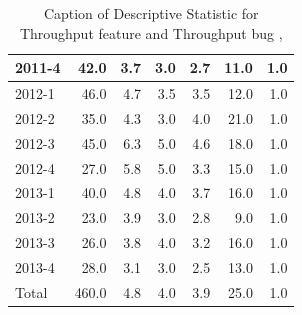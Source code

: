 \documentclass[UKenglish]{ifimaster}  %
\begin{document}
\begin{appendices}
\begin{table}[!htbp]
\begin{adjustwidth}{-2.5cm}{}
{{\begin{tabular}{ | l | r | r | r | r | r | r | }
2011-4 & 42.0 & 3.7 & 3.0 & 2.7 & 11.0 & 1.0\\ \hline
2012-1 & 46.0 & 4.7 & 3.5 & 3.5 & 12.0 & 1.0\\ \hline
2012-2 & 35.0 & 4.3 & 3.0 & 4.0 & 21.0 & 1.0\\ \hline
2012-3 & 45.0 & 6.3 & 5.0 & 4.6 & 18.0 & 1.0\\ \hline
2012-4 & 27.0 & 5.8 & 5.0 & 3.3 & 15.0 & 1.0\\ \hline
2013-1 & 40.0 & 4.8 & 4.0 & 3.7 & 16.0 & 1.0\\ \hline
2013-2 & 23.0 & 3.9 & 3.0 & 2.8 & 9.0 & 1.0\\ \hline
2013-3 & 26.0 & 3.8 & 4.0 & 3.2 & 16.0 & 1.0\\ \hline
2013-4 & 28.0 & 3.1 & 3.0 & 2.5 & 13.0 & 1.0\\ \hline
Total & 460.0 & 4.8 & 4.0 & 3.9 & 25.0 & 1.0\\ \hline
\end{tabular}
}
}
\end{adjustwidth}
\caption[Optional caption for list of figures]{Caption of Descriptive Statistic for Throughput feature and Throughput bug  , }
\label{DS:2:2}
\end{table}





\end{appendices}
\end{document}
